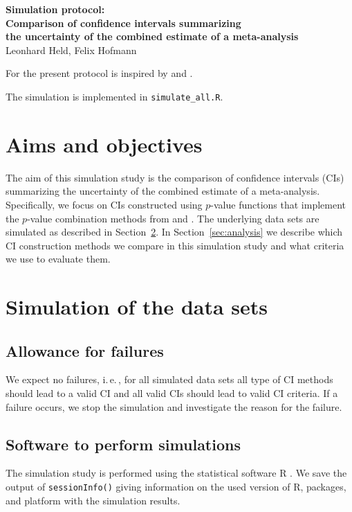 \documentclass[letterpaper, 12pt]{article}
\newcommand{\ie}{{i.\,e.\,}}
\begin{document}
\begin{center}
  {\noindent \LARGE \bf Simulation protocol:\\[2mm]
    Comparison of confidence intervals summarizing\\[2mm]
    the uncertainty of the combined estimate of a meta-analysis
  }\\
\bigskip
{\noindent \Large Leonhard Held, Felix Hofmann
}\end{center}
\bigskip
\vspace*{.5cm}

For the present protocol is inspired by \citet{burt:etal:06} and \citet{morr:etal:19}.

The simulation is implemented in \texttt{simulate\_all.R}.

\tableofcontents

\newpage 

\section{Aims and objectives}\label{ref:aims}

The aim of this simulation study is the comparison of confidence intervals
(CIs) summarizing the uncertainty of the combined estimate of a meta-analysis.
Specifically, we focus on CIs constructed using $p$-value functions that
implement the $p$-value combination methods from \citet{edgington:72} and
\citet{fisher:34}. The underlying data sets are simulated as described in
Section~\ref{sec:simproc}. In Section~\ref{sec:analysis} we describe which
CI construction methods we compare in this simulation study and what criteria
we use to evaluate them.

\section{Simulation of the data sets} \label{sec:simproc}

\subsection{Allowance for failures}
We expect no failures, \ie, for all simulated data sets all type of CI methods
should lead to a valid CI and all valid CIs should lead to valid CI criteria.
If a failure occurs, we stop the simulation and investigate the reason for the
failure.

\subsection{Software to perform simulations}
The simulation study is performed using the statistical software R \citep{R}.
We save the output of \texttt{sessionInfo()} giving information on the used
version of R, packages, and platform with the simulation results.
\end{document}
